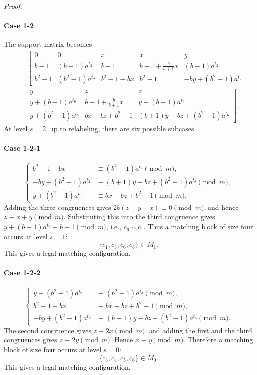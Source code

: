 \documentclass[11pt]{article}
\newcommand{\mymod}{\pmod{m}}
\begin{document}
\begin{proof}
\paragraph{Case 1-2}
The support matrix becomes
\begin{eqnarray*}
		~&~&\left[
        \begin{array}{ccccc}
			0 & 0 & x & x & y\\
            b-1 & (b-1)a^{t_2} & b-1 & b-1+\frac{b}{b+1}x & (b-1)a^{t_2}\\
            b^2 -1 &  (b^2-1)a^{t_2} & b^2-1-bx & b^2-1 & -by+(b^2-1)a^{t_2}
        \end{array}
        \right.\\
		~&~& \left. 
        \begin{array}{cccc}
			y & z & z\\			
			  y+(b-1)a^{t_6} & b-1+\frac{b}{b+1}x  & y+(b-1)a^{t_6} \\			
			y+(b^2-1)a^{t_6} & bx-bz+b^2-1 & (b+1)y-bz+(b^2-1)a^{t_6}
        \end{array}
        \right]
        .
\end{eqnarray*}
At level $s=2$, up to relabeling, there are six possible subcases.

\paragraph{Case 1-2-1}
$$
\begin{cases}
	b^2-1-bx &\equiv  (b^2-1)a^{t_2}\mymod,\\
	-by+(b^2-1)a^{t_2} &\equiv (b+1)y-bz+(b^2-1)a^{t_6}\mymod, \\
	y+(b^2-1)a^{t_6} &\equiv bx-bz+b^2-1\mymod.
\end{cases}
$$
Adding the three congruences gives
$2b(z-y-x)\equiv0\mymod$,
and hence $z\equiv x+y\mymod$. 
Substituting this into the third congruence gives 
$y+(b-1)a^{t_6}\equiv b-1 \mymod$, i.e., $c_6\sim_1 c_1$.
Thus a matching block of size four occurs at level $s=1$:
$$
\{c_1,c_3,c_6,c_8\}\in M_1.
$$
This gives a legal matching configuration.

\paragraph{Case 1-2-2}
$$
\begin{cases}
	y+(b^2-1)a^{t_6}&\equiv (b^2-1)a^{t_2}\mymod, \\
	b^2-1-bx &\equiv bx-bz+b^2-1\mymod, \\
	-by+(b^2-1)a^{t_2} &\equiv (b+1)y-bz+(b^2-1)a^{t_6}\mymod.
\end{cases}
$$
The second congruence gives $z\equiv2x\mymod$, and adding the first and the
third congruences gives $z\equiv2y\mymod$. Hence $x\equiv y\mymod$.
Therefore a matching block of size four occurs at level $s=0$:
$$
\{c_3,c_4,c_5,c_6\}\in M_0.
$$
This gives a legal matching configuration.


\end{proof}
\end{document}
